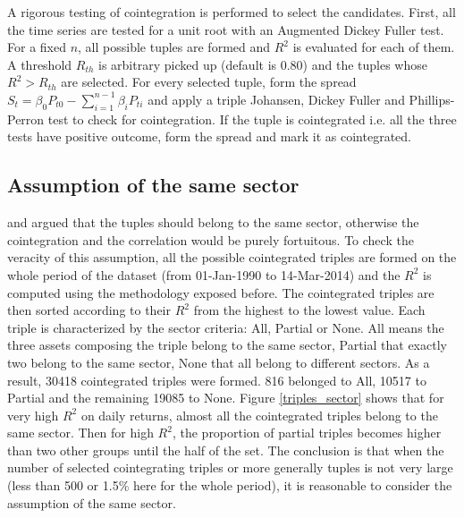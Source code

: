 \documentclass[11pt,a4,twosided,singlespacing,titlepagenumber=on]{scrreprt}
\numberwithin{equation}{chapter} %
\theoremstyle{remark}
\begin{document}
A rigorous testing of cointegration is performed to select the candidates. First, all the time series are tested for a unit root with an Augmented Dickey Fuller test. For a fixed $n$, all possible tuples are formed and $R^2$ is evaluated for each of them. A threshold $R_{th}$ is arbitrary picked up (default is 0.80) and the tuples whose $R^2> R_{th}$ are selected. For every selected tuple, form the spread $S_t = \beta_0 P_{t0} - \sum_{i=1}^{n-1} \beta_i P_{ti}$ and apply a triple Johansen, Dickey Fuller and Phillips-Perron test to check for cointegration. If the tuple is cointegrated i.e. all the three tests have positive outcome, form the spread and mark it as cointegrated.

\subsection{Assumption of the same sector}
\cite{chan2009} and \cite{dunis2010} argued that the tuples should belong to the same sector, otherwise the cointegration and the correlation would be purely fortuitous. To check the veracity of this assumption, all the possible cointegrated triples are formed on the whole period of the dataset (from 01-Jan-1990 to 14-Mar-2014) and the $R^2$ is computed using the methodology exposed before. The cointegrated triples are then sorted according to their $R^2$ from the highest to the lowest value. Each triple is characterized by the sector criteria: All, Partial or None. All means the three assets composing the triple belong to the same sector, Partial that exactly two belong to the same sector, None that all belong to different sectors. As a result, 30418 cointegrated triples were formed. 816 belonged to All, 10517 to Partial and the remaining 19085 to None. Figure \ref{triples_sector} shows that for very high $R^2$ on daily returns, almost all the cointegrated triples belong to the same sector. Then for high $R^2$, the proportion of partial triples becomes higher than two other groups until the half of the set. The conclusion is that when the number of selected cointegrating triples or more generally tuples is not very large (less than 500 or 1.5\% here for the whole period), it is reasonable to consider the assumption of the same sector.
\end{document}

